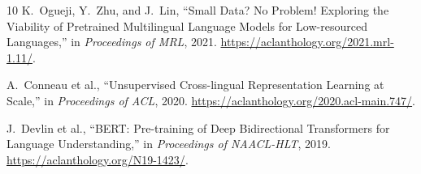 \documentclass[conference]{IEEEtran}
\begin{document}
\begin{thebibliography}{10}
K.~Ogueji, Y.~Zhu, and J.~Lin, ``Small Data? No Problem! Exploring the
Viability of Pretrained Multilingual Language Models for Low-resourced
Languages,'' in \emph{Proceedings of MRL}, 2021.
\url{https://aclanthology.org/2021.mrl-1.11/}.

A.~Conneau et al., ``Unsupervised Cross-lingual Representation Learning at
Scale,'' in \emph{Proceedings of ACL}, 2020.
\url{https://aclanthology.org/2020.acl-main.747/}.

J.~Devlin et al., ``BERT: Pre-training of Deep Bidirectional Transformers for
Language Understanding,'' in \emph{Proceedings of NAACL-HLT}, 2019.
\url{https://aclanthology.org/N19-1423/}.
\end{thebibliography}
\end{document}

